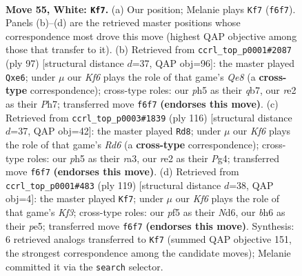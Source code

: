\documentclass[11pt]{article}
\begin{document}
\begin{figure}[p]\centering
\begin{subfigure}{0.46\textwidth}\centering
\resizebox{\linewidth}{!}{%
\newchessgame
\chessboard[
  setfen={3r4/1p5k/5Kpb/5p1p/P5P1/7P/4r3/8 w - - 1 55},
  showmover=false,
  pgfstyle=straightmove, color=movearrow, markmove={f6-f7}
]}
\caption{}
\end{subfigure}\hfill
\begin{subfigure}{0.46\textwidth}\centering
\resizebox{\linewidth}{!}{%
\newchessgame
\chessboard[
  setfen={5k2/1Q3p1p/4P3/8/5p1P/6P1/5PK1/4q3 b - - 2 49},
  showmover=false,
  pgfstyle=straightmove, color=movearrow, markmove={e1-e6}
]}
\caption{}
\end{subfigure}
\\[4pt]
\begin{subfigure}{0.46\textwidth}\centering
\resizebox{\linewidth}{!}{%
\newchessgame
\chessboard[
  setfen={8/5pk1/3R3p/6p1/6PP/r3P3/5PK1/8 w - - 44 59},
  showmover=false,
  pgfstyle=straightmove, color=movearrow, markmove={d6-d8}
]}
\caption{}
\end{subfigure}\hfill
\begin{subfigure}{0.46\textwidth}\centering
\resizebox{\linewidth}{!}{%
\newchessgame
\chessboard[
  setfen={8/8/3n1k2/p2PP3/N2K2pp/1P5P/8/8 b - - 0 60},
  showmover=false,
  pgfstyle=straightmove, color=movearrow, markmove={f6-f7}
]}
\caption{}
\end{subfigure}
\caption{\textbf{Move 55, White: \texttt{Kf7}.} (a) Our position; Melanie plays \texttt{Kf7} (\texttt{f6f7}). Panels (b)--(d) are the retrieved master positions whose correspondence most drove this move (highest QAP objective among those that transfer to it). (b) Retrieved from \texttt{ccrl\_top\_p0001\#2087} (ply 97) [structural distance $d$=37, QAP obj=96]: the master played \texttt{Qxe6}; under $\mu$ our \emph{Kf6} plays the role of that game's \emph{Qe8} (a \textbf{cross-type} correspondence); cross-type roles: our \emph{p}h5 as their \emph{q}b7, our \emph{r}e2 as their \emph{P}h7; transferred move \texttt{f6f7} \textbf{(endorses this move)}. (c) Retrieved from \texttt{ccrl\_top\_p0003\#1839} (ply 116) [structural distance $d$=37, QAP obj=42]: the master played \texttt{Rd8}; under $\mu$ our \emph{Kf6} plays the role of that game's \emph{Rd6} (a \textbf{cross-type} correspondence); cross-type roles: our \emph{p}h5 as their \emph{r}a3, our \emph{r}e2 as their \emph{P}g4; transferred move \texttt{f6f7} \textbf{(endorses this move)}. (d) Retrieved from \texttt{ccrl\_top\_p0001\#483} (ply 119) [structural distance $d$=38, QAP obj=4]: the master played \texttt{Kf7}; under $\mu$ our \emph{Kf6} plays the role of that game's \emph{Kf3}; cross-type roles: our \emph{p}f5 as their \emph{N}d6, our \emph{b}h6 as their \emph{p}e5; transferred move \texttt{f6f7} \textbf{(endorses this move)}. Synthesis: 6 retrieved analogs transferred to \texttt{Kf7} (summed QAP objective 151, the strongest correspondence among the candidate moves); Melanie committed it via the \texttt{search} selector.}
\label{fig:thought-m108}
\end{figure}
\end{document}
